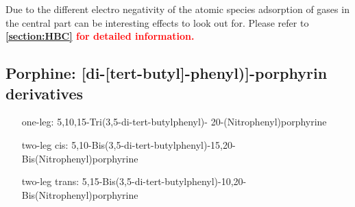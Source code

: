Due to the different electro negativity of the atomic species adsorption of gases in the central part can be interesting effects to look out for. Please refer to \textcolor{red}{\textbf{\autoref{section:HBC} for detailed information.}}


%


\subsection{Porphine: [di-[tert-butyl]-phenyl)]-porphyrin derivatives}
\label{sec:TBP}
\begin{itemize}
	\item[one-leg:]  	 5,10,15-Tri(3,5-di-tert-butylphenyl)-   20-(Nitrophenyl)porphyrine
	\item[two-leg cis:] 	5,10-Bis(3,5-di-tert-butylphenyl)-15,20-Bis(Nitrophenyl)porphyrine
	\item[two-leg trans:] 	5,15-Bis(3,5-di-tert-butylphenyl)-10,20-Bis(Nitrophenyl)porphyrine
\end{itemize}

